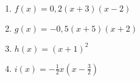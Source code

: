 \begin{Exercise}[title={Bestimme die Nullstellen und skizziere das Schaubild}, label=produktformNullstellenA2]\\
	\begin{minipage}{\textwidth}
		\begin{minipage}{0.49\textwidth}
			\begin{enumerate}[label=\alph*)]
				\item \(f(x)=0,2\left(x+3\right)\left(x-2\right)\)
				\item \(g(x)=-0,5\left(x+5\right)\left(x+2\right)\)
			\end{enumerate}
		\end{minipage}
		\begin{minipage}{0.49\textwidth}
			\begin{enumerate}[label=\alph*)]
				\setcounter{enumi}{2}
				\item \(h(x)=\left(x+1\right)^2\)
				\item \(i(x)=-\frac{1}{2}x\left(x-\frac{3}{2}\right)\)
			\end{enumerate}
		\end{minipage}
	\end{minipage}
\end{Exercise}

